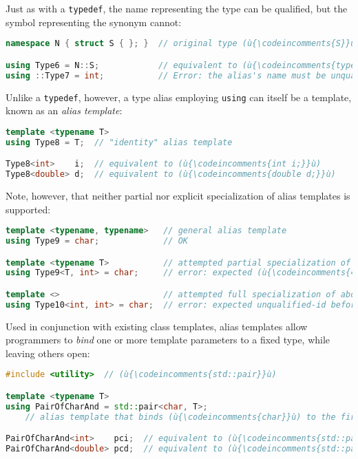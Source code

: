 \noindent Just as with a \texttt{typedef}, the name representing the type can be
qualified, but the symbol representing the synonym cannot:

\begin{lstlisting}[language=C++]
namespace N { struct S { }; }  // original type (ù{\codeincomments{S}}ù) defined with namespace (ù{\codeincomments{N}}ù)

using Type6 = N::S;            // equivalent to (ù{\codeincomments{typedef N::S Type6;}}ù)
using ::Type7 = int;           // Error: the alias's name must be unqualified.
\end{lstlisting}

\noindent Unlike a \texttt{typedef}, however, a type alias employing
\texttt{using} can itself be a template, known as an \emph{alias
template}:

\begin{lstlisting}[language=C++]
template <typename T>
using Type8 = T;  // "identity" alias template

Type8<int>    i;  // equivalent to (ù{\codeincomments{int i;}}ù)
Type8<double> d;  // equivalent to (ù{\codeincomments{double d;}}ù)
\end{lstlisting}

\noindent Note, however, that neither partial nor explicit specialization of alias
templates is supported:

\begin{lstlisting}[language=C++]
template <typename, typename>   // general alias template
using Type9 = char;             // OK

template <typename T>           // attempted partial specialization of above
using Type9<T, int> = char;     // error: expected (ù{\codeincomments{=}}ù) before (ù{\codeincomments{<}}ù) token

template <>                     // attempted full specialization of above
using Type10<int, int> = char;  // error: expected unqualified-id before (ù{\codeincomments{using}}ù)
\end{lstlisting}

\noindent Used in conjunction with existing class templates, alias templates allow
programmers to \emph{bind} one or more template parameters to a fixed
type, while leaving others open:

\begin{lstlisting}[language=C++]
#include <utility>  // (ù{\codeincomments{std::pair}}ù)

template <typename T>
using PairOfCharAnd = std::pair<char, T>;
    // alias template that binds (ù{\codeincomments{char}}ù) to the first type parameter of (ù{\codeincomments{std::pair}}ù)

PairOfCharAnd<int>    pci;  // equivalent to (ù{\codeincomments{std::pair<char, int> pci;}}ù)
PairOfCharAnd<double> pcd;  // equivalent to (ù{\codeincomments{std::pair<char, double> pcd;}}ù)
\end{lstlisting}


